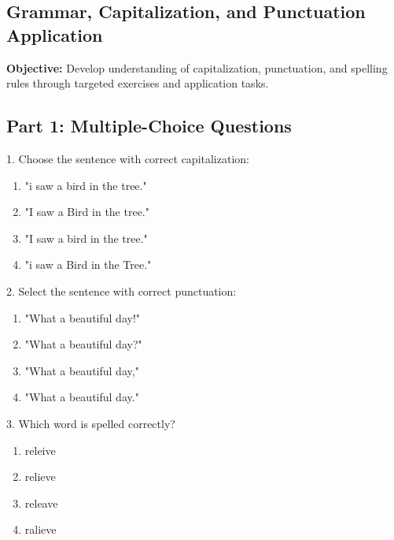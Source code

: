\documentclass[12pt]{article}
\begin{document}
\subsection*{Grammar, Capitalization, and Punctuation Application}
\onehalfspacing

\begin{tcolorbox}[colframe=black!40, colback=gray!0, title=Learning Objective]
\textbf{Objective:} Develop understanding of capitalization, punctuation, and spelling rules through targeted exercises and application tasks.
\end{tcolorbox}

\subsection*{Part 1: Multiple-Choice Questions}

1. Choose the sentence with correct capitalization:
\begin{enumerate}[label=\Alph*.]
    \item "i saw a bird in the tree."  
    \item "I saw a Bird in the tree."  
    \item "I saw a bird in the tree."  
    \item "i saw a Bird in the Tree."  
\end{enumerate}

\vspace{1cm}

2. Select the sentence with correct punctuation:
\begin{enumerate}[label=\Alph*.]
    \item "What a beautiful day!"  
    \item "What a beautiful day?"  
    \item "What a beautiful day,"  
    \item "What a beautiful day."  
\end{enumerate}

\vspace{1cm}

3. Which word is spelled correctly?
\begin{enumerate}[label=\Alph*.]
    \item releive  
    \item relieve  
    \item releave  
    \item ralieve  
\end{enumerate}

\vspace{1cm}
\newpage
\end{document}
